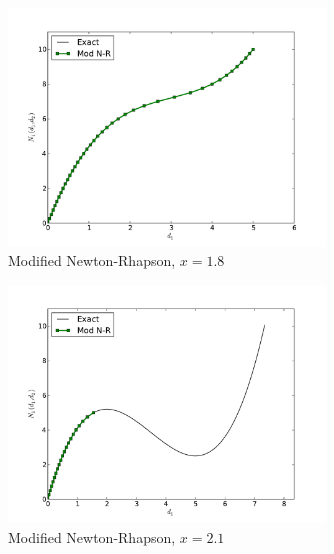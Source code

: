 \documentclass[12pt]{article}
\begin{document}
\begin{figure}[h!]
\centering
\includegraphics[width=0.75\textwidth]{MNR18.pdf}
\caption{Modified Newton-Rhapson, $x=1.8$}
\end{figure}
\begin{figure}[h!]
\centering
\includegraphics[width=0.75\textwidth]{MNR21.pdf}
\caption{Modified Newton-Rhapson, $x=2.1$}
\end{figure}
\end{document}
